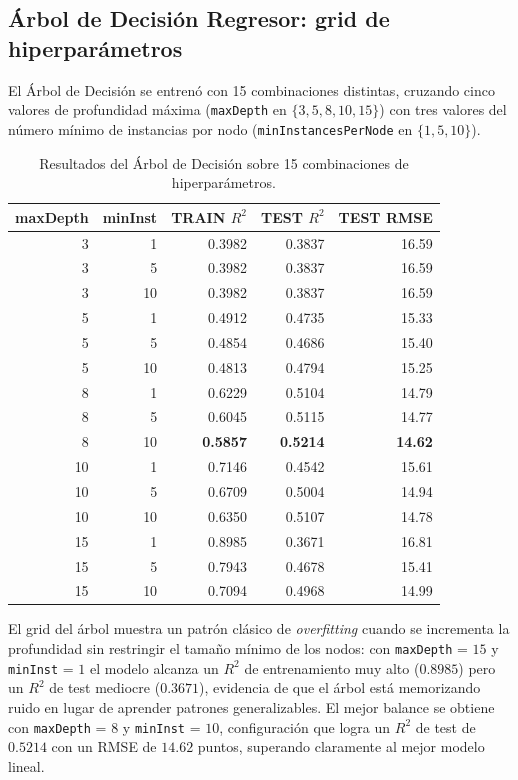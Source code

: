 \subsection{Árbol de Decisión Regresor: grid de hiperparámetros}
El Árbol de Decisión se entrenó con 15 combinaciones distintas, cruzando cinco valores de profundidad máxima (\texttt{maxDepth} en $\{3, 5, 8, 10, 15\}$) con tres valores del número mínimo de instancias por nodo (\texttt{minInstancesPerNode} en $\{1, 5, 10\}$).

\begin{table}[H]
\centering
\caption{Resultados del Árbol de Decisión sobre 15 combinaciones de hiperparámetros.}
\begin{tabular}{r r r r r}
\toprule
\textbf{maxDepth} & \textbf{minInst} & \textbf{TRAIN $R^2$} & \textbf{TEST $R^2$} & \textbf{TEST RMSE} \\
\midrule
 3 &  1 & 0.3982 & 0.3837 & 16.59 \\
 3 &  5 & 0.3982 & 0.3837 & 16.59 \\
 3 & 10 & 0.3982 & 0.3837 & 16.59 \\
 5 &  1 & 0.4912 & 0.4735 & 15.33 \\
 5 &  5 & 0.4854 & 0.4686 & 15.40 \\
 5 & 10 & 0.4813 & 0.4794 & 15.25 \\
 8 &  1 & 0.6229 & 0.5104 & 14.79 \\
 8 &  5 & 0.6045 & 0.5115 & 14.77 \\
 8 & 10 & \textbf{0.5857} & \textbf{0.5214} & \textbf{14.62} \\
10 &  1 & 0.7146 & 0.4542 & 15.61 \\
10 &  5 & 0.6709 & 0.5004 & 14.94 \\
10 & 10 & 0.6350 & 0.5107 & 14.78 \\
15 &  1 & 0.8985 & 0.3671 & 16.81 \\
15 &  5 & 0.7943 & 0.4678 & 15.41 \\
15 & 10 & 0.7094 & 0.4968 & 14.99 \\
\bottomrule
\end{tabular}
\end{table}

El grid del árbol muestra un patrón clásico de \textit{overfitting} cuando se incrementa la profundidad sin restringir el tamaño mínimo de los nodos: con \texttt{maxDepth} = $15$ y \texttt{minInst} = $1$ el modelo alcanza un $R^2$ de entrenamiento muy alto ($0.8985$) pero un $R^2$ de test mediocre ($0.3671$), evidencia de que el árbol está memorizando ruido en lugar de aprender patrones generalizables. El mejor balance se obtiene con \texttt{maxDepth} = $8$ y \texttt{minInst} = $10$, configuración que logra un $R^2$ de test de $0.5214$ con un RMSE de $14.62$ puntos, superando claramente al mejor modelo lineal.

